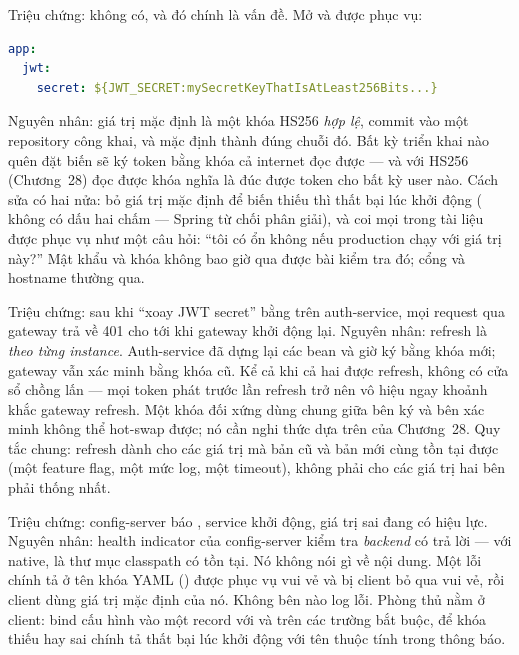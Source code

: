 \begin{pitfall}
Triệu chứng: không có, và đó chính là vấn đề. Mở 
và  được phục vụ:
\begin{lstlisting}[language=yaml]
app:
  jwt:
    secret: ${JWT_SECRET:mySecretKeyThatIsAtLeast256Bits...}
\end{lstlisting}
Nguyên nhân: giá trị mặc định là một khóa HS256 \emph{hợp lệ}, commit
vào một repository công khai, và  mặc định
 thành đúng chuỗi đó. Bất kỳ triển khai nào quên đặt
biến sẽ ký token bằng khóa cả internet đọc được --- và với HS256
(Chương~28) đọc được khóa nghĩa là đúc được token cho bất kỳ user nào.
Cách sửa có hai nửa: bỏ giá trị mặc định để biến thiếu thì thất bại lúc
khởi động ( không có dấu hai chấm --- Spring từ
chối phân giải), và coi mọi  trong tài liệu được
phục vụ như một câu hỏi: ``tôi có ổn không nếu production chạy với giá
trị này?'' Mật khẩu và khóa không bao giờ qua được bài kiểm tra đó;
cổng và hostname thường qua.
\end{pitfall}

\begin{pitfall}
Triệu chứng: sau khi ``xoay JWT secret'' bằng  trên auth-service, mọi request qua gateway trả về
401 cho tới khi gateway khởi động lại. Nguyên nhân: refresh là
\emph{theo từng instance}. Auth-service đã dựng lại các bean
 và giờ ký bằng khóa mới; gateway vẫn xác minh bằng
khóa cũ. Kể cả khi cả hai được refresh, không có cửa sổ chồng lấn ---
mọi token phát trước lần refresh trở nên vô hiệu ngay khoảnh khắc
gateway refresh. Một khóa đối xứng dùng chung giữa bên ký và bên xác
minh không thể hot-swap được; nó cần nghi thức dựa trên  của
Chương~28. Quy tắc chung: refresh dành cho các giá trị mà bản cũ và bản
mới cùng tồn tại được (một feature flag, một mức log, một timeout),
không phải cho các giá trị hai bên phải thống nhất.
\end{pitfall}

\begin{pitfall}
Triệu chứng: config-server báo , service khởi động, giá trị
sai đang có hiệu lực. Nguyên nhân: health indicator của config-server
kiểm tra \emph{backend} có trả lời --- với native, là thư mục classpath
có tồn tại. Nó không nói gì về nội dung. Một lỗi chính tả ở tên khóa
YAML () được phục vụ vui vẻ và bị client bỏ qua vui vẻ,
rồi client dùng giá trị mặc định của nó. Không bên nào log lỗi. Phòng
thủ nằm ở client: bind cấu hình vào một record
 với  và
 trên các trường bắt buộc, để khóa thiếu hay sai chính
tả thất bại lúc khởi động với tên thuộc tính trong thông báo.
\end{pitfall}

